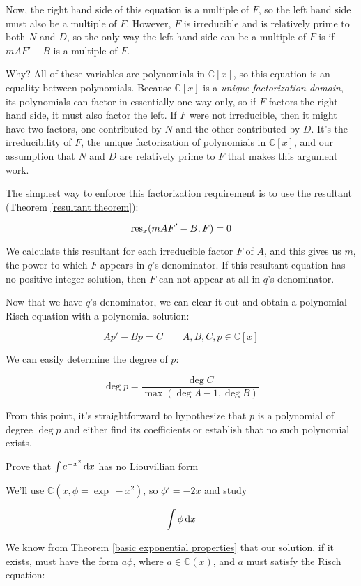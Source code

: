 Now, the right hand side of this equation is a multiple of $F$, so the
left hand side must also be a multiple of $F$.  However, $F$ is
irreducible and is relatively prime to both $N$ and $D$, so the only way
the left hand side can be a multiple of $F$ is if $m A F' - B$ is a
multiple of $F$.

Why?  All of these variables
are polynomials in ${\mathbb C}[x]$, so this equation is an equality
between polynomials.  Because ${\mathbb C}[x]$ is a {\it unique factorization domain}, its
polynomials can factor in essentially one way only, so if $F$ factors
the right hand side, it must also factor the left.  If $F$ were not
irreducible, then it might have two factors, one contributed by $N$
and the other contributed by $D$.  It's the irreducibility of $F$,
the unique factorization of polynomials in ${\mathbb C}[x]$, and
our assumption that $N$ and $D$ are relatively prime to $F$
that makes this argument work.

The simplest way to enforce this factorization requirement is to use
the resultant (Theorem \ref{resultant theorem}):

$${\rm res}_x(m A F' - B, F) = 0$$

We calculate this resultant for each irreducible factor $F$ of $A$,
and this gives us $m$, the power to which $F$ appears in $q$'s
denominator.  If this resultant equation has no positive integer
solution, then $F$ can not appear at all in $q$'s denominator.

Now that we have $q$'s denominator, we can clear it out and obtain
a polynomial Risch equation with a polynomial solution:

$$A p' - B p = C \qquad A,B,C,p \in {\mathbb C}[x]$$

We can easily determine the degree of $p$:

$$\deg p = \frac{\deg C}{\max(\deg A - 1, \deg B)}$$

From this point, it's straightforward to hypothesize that $p$ is a
polynomial of degree $\deg p$ and either find its coefficients or
establish that no such polynomial exists.

\vfill\eject

\example Prove that $\int e^{-x^2}\, {\rm d}x$ has no Liouvillian form

We'll use ${\mathbb C}(x, \phi = \exp\, -x^2)$, so $\phi' = -2x$ and
study

$$\int \phi \, {\rm d}x$$

We know from Theorem \ref{basic exponential properties} that our
solution, if it exists, must have the form $a\phi$, where $a \in
{\mathbb C}(x)$, and $a$ must satisfy the Risch equation:

